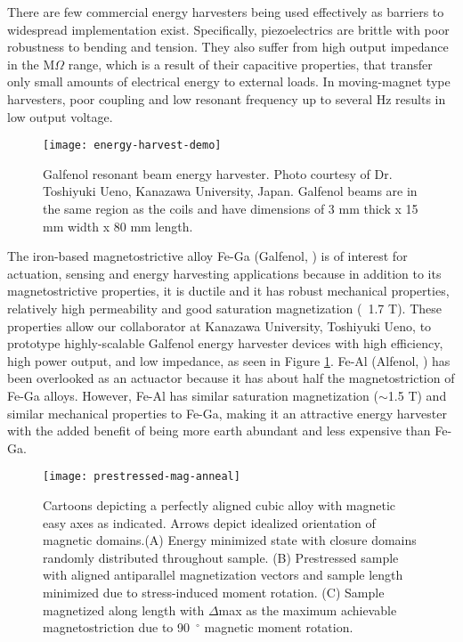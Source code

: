 There are few commercial energy harvesters being used effectively as barriers to widespread implementation exist. Specifically, piezoelectrics are brittle with poor robustness to bending and tension. They also suffer from high output impedance in the M$\Omega$ range, which is a result of their capacitive properties, that transfer only small amounts of electrical energy to external loads. In moving-magnet type harvesters, poor coupling and low resonant frequency up to several Hz results in low output voltage. 
\begin{figure}[h!] %
	\centering
	\texttt{[image: energy-harvest-demo]}
	\caption{Galfenol resonant beam energy harvester. Photo courtesy of Dr. Toshiyuki Ueno, Kanazawa University, Japan. Galfenol beams are in the same region as the coils and have dimensions of 3 mm thick x 15 mm width x 80 mm length.\cite{Slaughter2011}}
	\label{fig:energy-harvest-demo}
\end{figure}
The iron-based magnetostrictive alloy Fe-Ga (Galfenol, \fegacomp) is of interest for actuation, sensing and energy harvesting applications because in addition to its magnetostrictive properties, it is ductile and it has robust mechanical properties\cite{Clark2003}, relatively high permeability and good saturation magnetization (~1.7 T)\cite{Clark2002}. These properties allow our collaborator at Kanazawa University, Toshiyuki Ueno, to prototype highly-scalable Galfenol energy harvester devices with high efficiency, high power output, and low impedance\cite{Ueno2015a}, as seen in Figure \ref{fig:energy-harvest-demo}. Fe-Al (Alfenol, \fealcomp) has been overlooked as an actuactor because it has about half the magnetostriction of Fe-Ga alloys. However, Fe-Al has similar saturation magnetization ($\sim$1.5 T) and similar mechanical properties to Fe-Ga, making it an attractive energy harvester with the added benefit of being more earth abundant and less expensive than Fe-Ga\cite{Na2014a,Raghunath2014a}. 		

\begin{figure}[h]
	\centering
	\texttt{[image: prestressed-mag-anneal]}
	\caption{Cartoons depicting a perfectly aligned cubic alloy with \hkl<100> magnetic easy axes as indicated. Arrows depict idealized orientation of magnetic domains.(A) Energy minimized state with closure domains randomly distributed throughout sample.  (B) Prestressed sample with aligned antiparallel magnetization vectors and sample length minimized due to stress-induced moment rotation. (C) Sample magnetized along length with $\Delta$max as the maximum achievable magnetostriction due to 90~$^{\circ}$ magnetic moment rotation.}
	\label{fig:prestressed-mag-anneal}
\end{figure}


